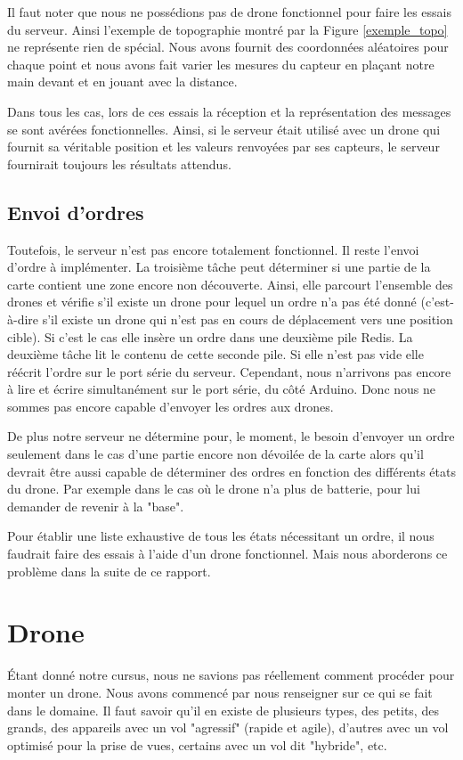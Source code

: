 \documentclass[a4paper,10pt]{report}
\begin{document}
      Il faut noter que nous ne possédions pas de drone fonctionnel pour faire 
les essais du serveur. Ainsi l'exemple de topographie montré par la 
Figure \ref{exemple_topo} ne représente rien de spécial. Nous avons fournit des 
coordonnées aléatoires pour chaque point et nous avons fait varier les mesures 
du capteur en plaçant notre main devant et en jouant avec la distance.

      Dans tous les cas, lors de ces essais la réception et la représentation 
des messages se sont avérées fonctionnelles. Ainsi, si le serveur était utilisé 
avec un drone qui fournit sa véritable position et les valeurs renvoyées par 
ses capteurs, le serveur fournirait toujours les résultats attendus.

    \section{Envoi d'ordres}
      Toutefois, le serveur n'est pas encore totalement fonctionnel. Il reste 
l'envoi d'ordre à implémenter. La troisième tâche peut déterminer si une partie 
de la carte contient une zone encore non découverte. Ainsi, elle parcourt 
l'ensemble des drones et vérifie s'il existe un drone pour lequel un ordre n'a 
pas été donné (c'est-à-dire s'il existe un drone qui n'est pas en cours de 
déplacement vers une position cible). Si c'est le cas elle insère un ordre dans 
une deuxième pile Redis. La deuxième tâche lit le contenu de cette seconde 
pile. Si elle n'est pas vide elle réécrit l'ordre sur le port série du serveur. 
Cependant, nous n'arrivons pas encore à lire et écrire simultanément sur le 
port série, du côté Arduino. Donc nous ne sommes pas encore capable d'envoyer 
les ordres aux drones.

      De plus notre serveur ne détermine pour, le moment, le besoin d'envoyer 
un ordre seulement dans le cas d'une partie encore non dévoilée de la carte 
alors qu'il devrait être aussi capable de déterminer des ordres en fonction des 
différents états du drone. Par exemple dans le cas où le drone n'a plus de 
batterie, pour lui demander de revenir à la "base". 

      Pour établir une liste exhaustive de tous les états nécessitant un ordre, 
il nous faudrait faire des essais à l'aide d'un drone fonctionnel. Mais nous 
aborderons ce problème dans la suite de ce rapport.
	

  \chapter{Drone}
    Étant donné notre cursus, nous ne savions pas réellement comment procéder 
pour monter un drone. Nous avons commencé par nous renseigner sur ce qui se 
fait dans le domaine. Il faut savoir qu'il en existe de plusieurs types, 
des petits, des grands, des appareils avec un vol "agressif" (rapide et agile), 
d'autres avec un vol optimisé pour la prise de vues, certains avec un vol dit 
"hybride", etc.
    
\end{document}
